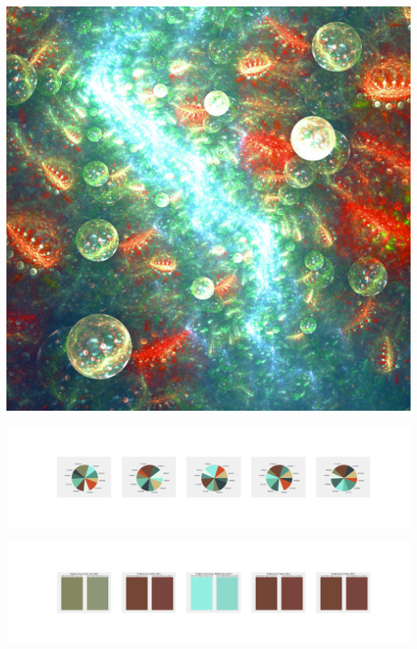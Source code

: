 \documentclass[11pt]{article}
\begin{document}
\begin{landscape}
    \begin{center}
    \includegraphics[width=\textwidth]{./nbimg/file (193).jpg}
    \end{center}

    \begin{center}
    \includegraphics[width=250mm]{./nbimg/pie-104.jpg}
    \end{center}

    \begin{center}
    \includegraphics[width=250mm]{./nbimg/peak-104.jpg}
    \end{center}
    


\end{landscape}
\end{document}
